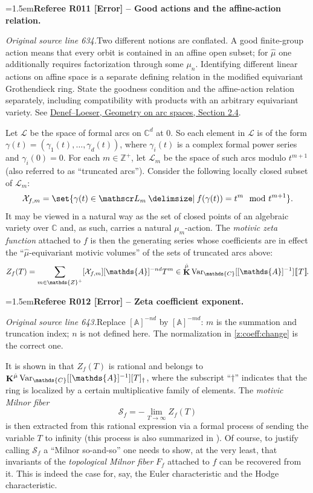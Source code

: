 \documentclass[12pt]{amsart}
\newcommand{\RefereeRemark}[4]{%
  \par\medskip\begingroup\normalfont\small\color{RefereePurple}%
  \emergencystretch=1.5em\noindent\textbf{Referee R#1 [#2] -- #3.}\par\nobreak\noindent #4\par
  \endgroup\medskip
}
\newcommand{\memph}[1]{{\color{magenta}\emph{#1}}}
\theoremstyle{plain}
\theoremstyle{definition}
\theoremstyle{remark}
\numberwithin{equation}{section}
\theoremstyle{plain}
\newcommand{\Z}{\mathds{Z}}
\newcommand{\A}{\mathds{A}}
\newcommand{\C}{\mathds{C}}
\newcommand{\0}{\emptyset}
\newcommand{\dbra}[1]{%
  \,[\mkern-6.8mu[\, #1 \,]\mkern-6.8mu]}
\newcommand{\mdl}[1]{\mathcal{#1}}  %
\newcommand{\limplies}{\rightarrow}
\providecommand\given{}
\newcommand\SetSymbol[1][]{%
\nonscript \: #1 \vert
\allowbreak
\nonscript\:
\mathopen{}}
\renewcommand\given{\SetSymbol[\delimsize]}
\DeclareMathOperator{\ggk}{\mathbf{K}}
\newcommand{\var}{\textup{Var}}
\newcommand{\gmv}{\ggk^{\hat \mu}\var_{\C}}
\begin{document}
\RefereeRemark{011}{Error}{Good actions and the affine-action relation}{%
\textit{Original source line 634.}\quad Two different notions are conflated. A good finite-group action means that every orbit is contained in an affine open subset; for $\hat\mu$ one additionally requires factorization through some $\mu_n$. Identifying different linear actions on affine space is a separate defining relation in the modified equivariant Grothendieck ring. State the goodness condition and the affine-action relation separately, including compatibility with products with an arbitrary equivariant variety. See \href{https://arxiv.org/pdf/math/0006050}{Denef--Loeser, Geometry on arc spaces, Section 2.4}.
}

Let $\mathscr L$ be the space of formal arcs on $\C^d$ at $0$. So each element in $\mathscr L$ is of the form $\gamma(t) = (\gamma_1(t), \ldots, \gamma_d(t))$, where $\gamma_i(t)$ is a complex formal power series and $\gamma_i(0) = 0$. For each $m \in \Z^+$, let $\mathscr L_m$ be the space of such arcs modulo $t^{m+1}$ (also referred to as ``truncated arcs''). Consider the following locally closed subset of $\mathscr L_m$:
\begin{equation*}
  \mdl X_{f,m}  = \set{\gamma(t) \in \mathscr L_m \given f(\gamma(t)) = t^m \mod t^{m+1} }.
\end{equation*}
It may be viewed in a natural way as the set of closed points of an algebraic variety over $\C$ and, as such, carries a natural $\mu_{m}$-action. The \memph{motivic zeta function} attached to $f$ is then the generating series whose coefficients are in effect the ``$\hat \mu$-equivariant motivic volumes'' of the sets of truncated arcs above:
\[
 Z_f(T) = \sum_{m \in \Z^+} [\mdl X_{f,m}] [\A]^{-nd}T^m \in \gmv[[\A]^{-1}] \dbra{T}.
\]

\RefereeRemark{012}{Error}{Zeta coefficient exponent}{%
\textit{Original source line 643.}\quad Replace $[\A]^{-nd}$ by $[\A]^{-md}$: $m$ is the summation and truncation index; $n$ is not defined here. The normalization in \eqref{z:coeff:change} is the correct one.
}
It is  shown in \cite{denefloeser:arc, den:loe:2002} that $Z_f(T)$ is rational and belongs to $\gmv[[\A]^{-1}][T]_\dag$, where the subscript ``$\dag$'' indicates that the ring is localized by  a certain multiplicative family of elements. The \memph{motivic Milnor fiber}
\[
\mathscr S_{f} = - \lim_{T \limplies \infty} Z_{f}(T)
\]
is then extracted from this rational expression via a formal process of sending the variable $T$ to infinity (this process is also summarized in \cite[\S~8.4]{hru:loe:lef}). Of course, to justify calling $\mathscr S_{f}$ a ``Milnor so-and-so'' one needs to show, at the very least, that invariants of the \memph{topological Milnor fiber} $F_{f}$ attached to $f$ can be recovered from it.  This is indeed the case for, say, the Euler characteristic and the Hodge characteristic.
\end{document}

